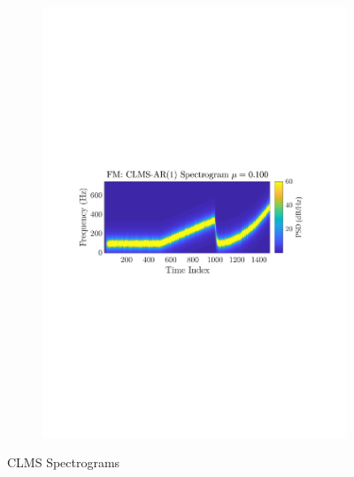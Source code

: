 \documentclass[12pt]{article}
\begin{document}
\begin{figure}[H]
\begin{subfigure}{0.49\textwidth}
					\includegraphics[trim={2.2cm 11.2cm 3.00cm  11.2cm}, clip, width=\textwidth]{../MATLAB/figures/q3_2b_fig04.pdf} 
					\captionsetup{justification=centering}
				\end{subfigure}
				
				\captionsetup{justification=centering}
				\caption{CLMS Spectrograms}
				\label{fig: 3-2b}
			\end{figure}
		
\end{document}
